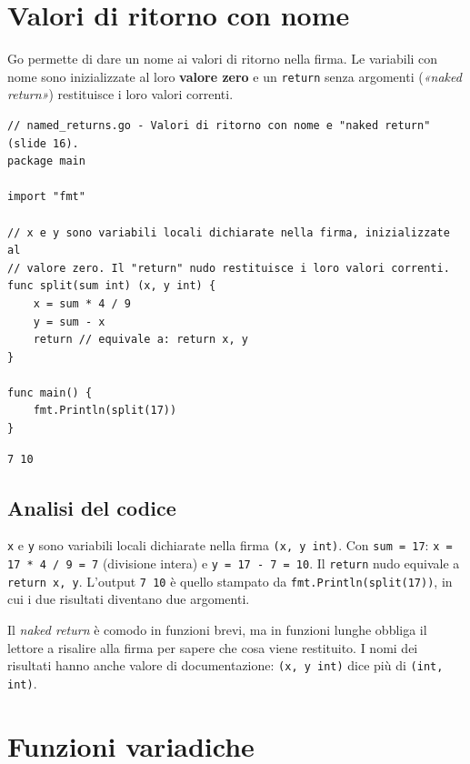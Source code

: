\documentclass[11pt,a4paper]{report}
\newcommand{\cod}[1]{\texttt{#1}}
\begin{document}
\section{Valori di ritorno con nome}

Go permette di dare un nome ai valori di ritorno nella firma. Le variabili con
nome sono inizializzate al loro \textbf{valore zero} e un \cod{return} senza
argomenti (\emph{«naked return»}) restituisce i loro valori correnti.

\begin{lstlisting}[style=gocode,caption={\texttt{02\_functions/named\_returns.go}}]
// named_returns.go - Valori di ritorno con nome e "naked return" (slide 16).
package main

import "fmt"

// x e y sono variabili locali dichiarate nella firma, inizializzate al
// valore zero. Il "return" nudo restituisce i loro valori correnti.
func split(sum int) (x, y int) {
	x = sum * 4 / 9
	y = sum - x
	return // equivale a: return x, y
}

func main() {
	fmt.Println(split(17))
}
\end{lstlisting}
\begin{lstlisting}[style=output]
7 10
\end{lstlisting}

\subsection{Analisi del codice}

\cod{x} e \cod{y} sono variabili locali dichiarate nella firma
\cod{(x, y int)}. Con \cod{sum = 17}: \cod{x = 17 * 4 / 9 = 7} (divisione
intera) e \cod{y = 17 - 7 = 10}. Il \cod{return} nudo equivale a
\cod{return x, y}. L'output \cod{7 10} è quello stampato da
\cod{fmt.Println(split(17))}, in cui i due risultati diventano due argomenti.

\begin{attenzione}
Il \emph{naked return} è comodo in funzioni brevi, ma in funzioni lunghe obbliga
il lettore a risalire alla firma per sapere che cosa viene restituito. I nomi
dei risultati hanno anche valore di documentazione: \cod{(x, y int)} dice più di
\cod{(int, int)}.
\end{attenzione}

\section{Funzioni variadiche}
\end{document}
